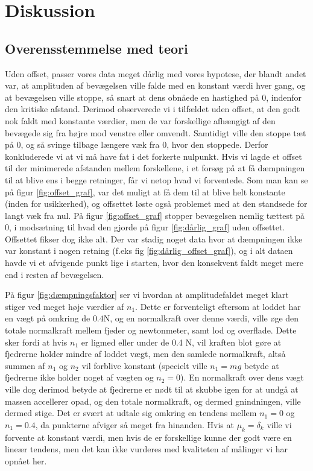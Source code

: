 \chapter{Diskussion}
\section{Overensstemmelse med teori}
Uden offset, passer vores data meget dårlig med vores hypotese, der blandt andet var, 
at amplituden af bevægelsen ville falde med en konstant værdi hver gang, og at bevægelsen ville stoppe, 
så snart at dens obnåede en hastighed på 0, indenfor den kritiske afstand. 
Derimod observerede vi i tilfældet uden offset, at den godt nok faldt med konstante værdier, men de var forskellige afhængigt af den bevægede sig fra højre mod venstre eller omvendt.
Samtidigt ville den stoppe tæt på 0, og så svinge tilbage længere væk fra 0, hvor den stoppede. Derfor konkluderede vi at vi må have fat i det forkerte nulpunkt. 
Hvis vi lagde et offset til der minimerede afstanden mellem forskellene, i et forsøg på at få dæmpningen til at blive ens i begge retninger, får vi netop hvad vi forventede. 
Som man kan se på figur \ref{fig:offset_graf}, var det muligt at få dem til at blive helt konstante (inden for usikkerhed), og offsettet løste også problemet med at den standsede for langt væk fra nul. 
På figur \ref{fig:offset_graf} stopper bevægelsen nemlig tættest på 0, i modsætning til hvad den gjorde på figur \ref{fig:dårlig_graf} uden offsettet.
Offsettet fikser dog ikke alt. Der var stadig noget data hvor at dæmpningen ikke var konstant i nogen retning (f.eks fig \ref{fig:dårlig_offset_graf}), 
og i alt dataen havde vi et afvigende punkt lige i starten, hvor den konsekvent faldt meget mere end i resten af bevægelsen.

På figur \ref{fig:dæmpningsfaktor} ser vi hvordan at amplitudefaldet meget klart stiger ved meget høje værdier af $n_1$. 
Dette er forventeligt eftersom at loddet har en vægt på omkring de $0.4$N, og en normalkraft over denne værdi, ville øge den totale normalkraft mellem fjeder og newtonmeter, samt lod og overflade.
Dette sker fordi at hvis $n_1$ er ligmed eller under de 0.4 N, vil kraften blot gøre at fjedrerne holder mindre af loddet vægt, men den samlede normalkraft, altså summen af $n_1$ og $n_2$ vil forblive konstant (specielt ville $n_1 = mg$ betyde at fjedrerne ikke holder noget af vægten og $n_2 = 0$). 
En normalkraft over dens vægt ville dog derimod betyde at fjedrerne er nødt til at skubbe igen for at undgå at massen accellerer opad, og den totale normalkraft, og dermed gnindningen, ville dermed stige.
Det er svært at udtale sig omkring en tendens mellem $n_1 = 0$ og $n_1 = 0.4$, da punkterne afviger så meget fra hinanden. Hvis at $\mu_k = \delta_k$ ville vi forvente at konstant værdi, men hvis de er forskellige kunne der godt være en lineær tendens, 
men det kan ikke vurderes med kvaliteten af målinger vi har opnået her. 
